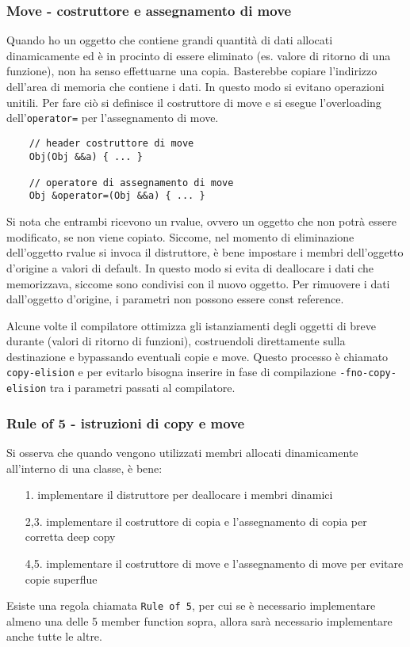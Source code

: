 \documentclass[a4paper]{article}
\begin{document}
\subsubsection*{Move - costruttore e assegnamento di move}
Quando ho un oggetto che contiene grandi quantità di dati allocati dinamicamente ed è in procinto di essere eliminato (es. valore
di ritorno di una funzione), non ha senso effettuarne una copia. Basterebbe copiare l'indirizzo dell'area di memoria che contiene
i dati. In questo modo si evitano operazioni unitili. Per fare ciò si definisce il costruttore di move e si esegue l'overloading
dell'\verb|operator=| per l'assegnamento di move.
\begin{lstlisting}
	// header costruttore di move
	Obj(Obj &&a) { ... }

	// operatore di assegnamento di move
	Obj &operator=(Obj &&a) { ... }
\end{lstlisting}
Si nota che entrambi ricevono un rvalue, ovvero un oggetto che non potrà essere modificato, se non viene copiato. Siccome, nel
momento di eliminazione dell'oggetto rvalue si invoca il distruttore, è bene impostare i membri dell'oggetto d'origine a valori
di default. In questo modo si evita di deallocare i dati che memorizzava, siccome sono condivisi con il nuovo oggetto.
Per rimuovere i dati dall'oggetto d'origine, i parametri non possono essere const reference.

Alcune volte il compilatore ottimizza gli istanziamenti degli oggetti di breve durante (valori di ritorno di funzioni),
costruendoli direttamente sulla destinazione e bypassando eventuali copie e move. Questo processo è chiamato \verb|copy-elision|
e per evitarlo bisogna inserire in fase di compilazione \verb|-fno-copy-elision| tra i parametri passati al compilatore.

\subsubsection*{Rule of 5 - istruzioni di copy e move}
Si osserva che quando vengono utilizzati membri allocati dinamicamente all'interno di una classe, è bene:
\begin{itemize}
	\item[1.] implementare il distruttore per deallocare i membri dinamici
	\item[2,3.] implementare il costruttore di copia e l'assegnamento di copia per corretta deep copy
	\item[4,5.] implementare il costruttore di move e l'assegnamento di move per evitare copie superflue
\end{itemize}
Esiste una regola chiamata \verb|Rule of 5|, per cui se è necessario implementare almeno una delle 5 member function sopra, allora
sarà necessario implementare anche tutte le altre.
\end{document}
